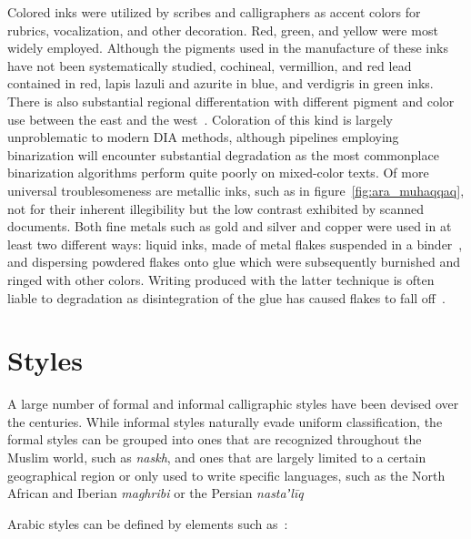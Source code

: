 Colored inks were utilized by scribes and calligraphers as accent colors for
rubrics, vocalization, and other decoration. Red, green, and yellow were most
widely employed. Although the pigments used in the manufacture of these inks
have not been systematically studied, cochineal, vermillion, and red lead
contained in red, lapis lazuli and azurite in blue, and verdigris in green
inks. There is also substantial regional differentation with different pigment
and color use between the east and the west~\cite[pg. 63]{blair2006islamic}.
Coloration of this kind is largely unproblematic to modern DIA methods,
although pipelines employing binarization will encounter substantial
degradation as the most commonplace binarization algorithms perform quite
poorly on mixed-color texts. Of more universal troublesomeness are metallic
inks, such as in figure~\ref{fig:ara_muhaqqaq}, not for their inherent
illegibility but the low contrast exhibited by scanned documents. Both fine
metals such as gold and silver and copper were used in at least two different
ways: liquid inks, made of metal flakes suspended in a binder~\cite[pg.
225-227]{raggetti2019inks}, and dispersing powdered flakes onto glue which were
subsequently burnished and ringed with other colors. Writing produced with the
latter technique is often liable to degradation as disintegration of the glue
has caused flakes to fall off~\cite[pg. 63]{blair2006islamic}.

\section{Styles}

A large number of formal and informal calligraphic styles have been devised
over the centuries. While informal styles naturally evade uniform
classification, the formal styles can be grouped into ones that are recognized
throughout the Muslim world, such as \emph{naskh}, and ones that are largely
limited to a certain geographical region or only used to write specific
languages, such as the North African and Iberian \emph{maghribi} or the Persian
\emph{nastaʼlīq}  

Arabic styles can be defined by elements such as~\cite[pg. 242-243]{gacek2009arabic}:

